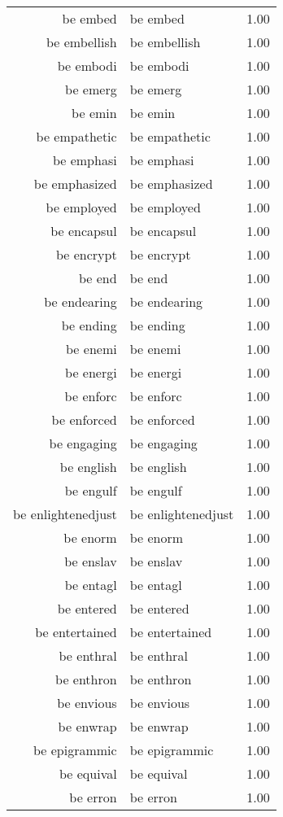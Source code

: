 \begin{table}[ht]
\begin{tabular}{rlr}
  be embed & be embed & 1.00 \\ 
  be embellish & be embellish & 1.00 \\ 
  be embodi & be embodi & 1.00 \\ 
  be emerg & be emerg & 1.00 \\ 
  be emin & be emin & 1.00 \\ 
  be empathetic & be empathetic & 1.00 \\ 
  be emphasi & be emphasi & 1.00 \\ 
  be emphasized & be emphasized & 1.00 \\ 
  be employed & be employed & 1.00 \\ 
  be encapsul & be encapsul & 1.00 \\ 
  be encrypt & be encrypt & 1.00 \\ 
  be end & be end & 1.00 \\ 
  be endearing & be endearing & 1.00 \\ 
  be ending & be ending & 1.00 \\ 
  be enemi & be enemi & 1.00 \\ 
  be energi & be energi & 1.00 \\ 
  be enforc & be enforc & 1.00 \\ 
  be enforced & be enforced & 1.00 \\ 
  be engaging & be engaging & 1.00 \\ 
  be english & be english & 1.00 \\ 
  be engulf & be engulf & 1.00 \\ 
  be enlightenedjust & be enlightenedjust & 1.00 \\ 
  be enorm & be enorm & 1.00 \\ 
  be enslav & be enslav & 1.00 \\ 
  be entagl & be entagl & 1.00 \\ 
  be entered & be entered & 1.00 \\ 
  be entertained & be entertained & 1.00 \\ 
  be enthral & be enthral & 1.00 \\ 
  be enthron & be enthron & 1.00 \\ 
  be envious & be envious & 1.00 \\ 
  be enwrap & be enwrap & 1.00 \\ 
  be epigrammic & be epigrammic & 1.00 \\ 
  be equival & be equival & 1.00 \\ 
  be erron & be erron & 1.00 \\ 

\end{tabular}
\end{table}
